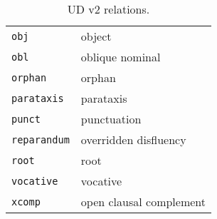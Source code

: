 \begin{table}[ht]
\begin{tabular}{ll}
\texttt{obj} & object \\
\texttt{obl} & oblique nominal \\
\texttt{orphan} & orphan \\
\texttt{parataxis} & parataxis \\
\texttt{punct} & punctuation \\
\texttt{reparandum} & overridden disfluency \\
\texttt{root} & root \\
\texttt{vocative} & vocative \\
\texttt{xcomp} & open clausal complement
\end{tabular}
\caption{UD v2 relations.\label{tab:ud}}
\end{table}

